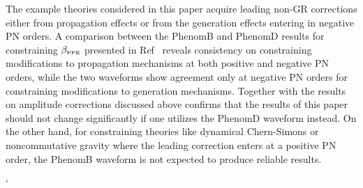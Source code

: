 \documentclass[prd,twocolumn,nofootinbib]{revtex4-1}
\newcommand{\PPE}{{\mbox{\tiny PPE}}}
\begin{document}
The example theories considered in this paper acquire leading non-GR corrections either from propagation effects or from the generation effects entering in negative PN orders. A comparison between the PhenomB and PhenomD results for constraining $\beta_{\PPE}$ presented in Ref~\cite{Yunes:2016jcc} reveals consistency on constraining modifications to propagation mechanisms at both positive and negative PN orders, while the two waveforms show agreement only at negative PN orders for constraining modifications to generation mechanisms. Together with the results on amplitude corrections discussed above confirms that the results of this paper should not change significantly if one utilizes the PhenomD waveform instead. On the other hand, for constraining theories like dynamical Chern-Simons or noncommutative gravity where the leading correction enters at a positive PN order, the PhenomB waveform is not expected to produce reliable results.



`
\end{document}
